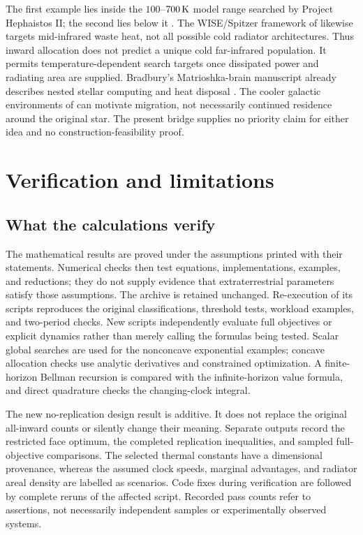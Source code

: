 \documentclass[11pt,a4paper]{article}
\theoremstyle{definition}\newtheorem{definition}{Definition}
\begin{document}
The first example lies inside the $100$--$700\,{\rm K}$ model range
searched by Project Hephaistos II; the second lies below it
\citep{Suazo2024}. The WISE/Spitzer framework of \citet{Wright2014b}
likewise targets mid-infrared waste heat, not all possible cold radiator
architectures. Thus inward allocation does not predict a unique cold
far-infrared population. It permits temperature-dependent search targets
once dissipated power and radiating area are supplied. Bradbury's
Matrioshka-brain manuscript already describes nested stellar computing
and heat disposal \citep{Bradbury1999}. The cooler galactic environments
of \citet{CirkovicBradbury2006} can motivate migration, not necessarily
continued residence around the original star. The present bridge supplies
no priority claim for either idea and no construction-feasibility proof.

\section{Verification and limitations}
\label{sec:verification}
\subsection{What the calculations verify}
The mathematical results are proved under the assumptions printed with
their statements. Numerical checks then test equations, implementations,
examples, and reductions; they do not supply evidence that extraterrestrial
parameters satisfy those assumptions. The archive is retained unchanged.
Re-execution of its scripts reproduces the original classifications,
threshold tests, workload examples, and two-period checks. New scripts
independently evaluate full objectives or explicit dynamics rather than
merely calling the formulas being tested. Scalar global searches are used
for the nonconcave exponential examples; concave allocation checks use
analytic derivatives and constrained optimization. A finite-horizon
Bellman recursion is compared with the infinite-horizon value formula,
and direct quadrature checks the changing-clock integral.

The new no-replication design result is additive. It does not replace the
original all-inward counts or silently change their meaning. Separate
outputs record the restricted face optimum, the completed replication
inequalities, and sampled full-objective comparisons. The selected
thermal constants have a dimensional provenance, whereas the assumed
clock speeds, marginal advantages, and radiator areal density are labelled
as scenarios. Code fixes during verification are followed by complete
reruns of the affected script. Recorded pass counts refer to assertions,
not necessarily independent samples or experimentally observed systems.
\end{document}
